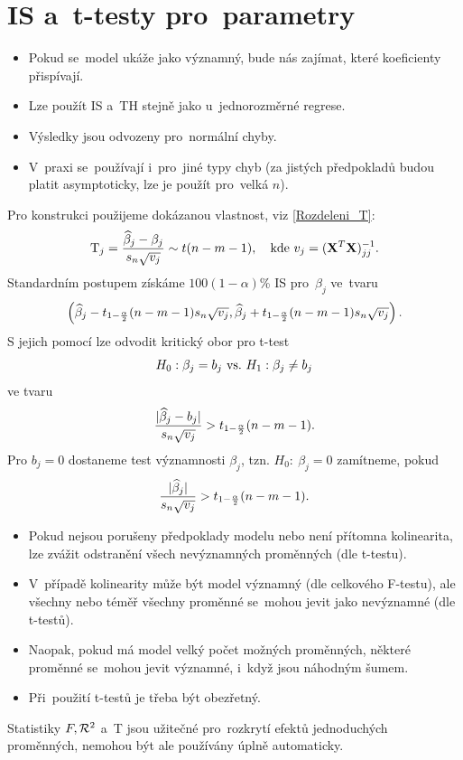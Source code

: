 \section{IS a~t-testy pro~parametry}
\begin{itemize}
	\item Pokud se~model ukáže jako významný, bude nás zajímat, které koeficienty přispívají.
	\item Lze použít IS a~TH stejně jako u~jednorozměrné regrese.
	\item Výsledky jsou odvozeny pro~normální chyby.
	\item V~praxi se~používají i~pro~jiné typy chyb (za jistých předpokladů budou platit asymptoticky, lze je použít pro~velká $n$).
\end{itemize}
Pro konstrukci použijeme dokázanou vlastnost, viz \eqref{Rozdeleni_T}:
 $$ \mathrm{T}_j = \frac{\widehat{\beta}_j-\beta_j}{s_n\sqrt{v_j}}\sim t(n-m-1),\quad\text{kde } v_j = (\mathbf{X}^T\mathbf{X})_{jj}^{-1}. $$
Standardním postupem získáme $100(1-\alpha)$\% IS pro~$\beta_j$ ve~tvaru
 $$ \left(\widehat{\beta}_j-t_{1-\frac{\alpha}{2}}(n-m-1)s_n\sqrt{v_j},\widehat{\beta}_j+t_{1-\frac{\alpha}{2}}(n-m-1)s_n\sqrt{v_j} \right).$$
S jejich pomocí lze odvodit kritický obor pro t-test
 $$ H_0: \beta_j = b_j ~\text{vs.}~ H_1: \beta_j\neq b_j $$
ve tvaru
 $$ \frac{|\widehat{\beta}_j-b_j|}{s_n\sqrt{v_j}}>t_{1-\frac{\alpha}{2}}(n-m-1).$$
Pro $b_j = 0$ dostaneme test významnosti $\beta_j$, tzn. $H_0:~\beta_j = 0$ zamítneme, pokud
 $$ \frac{|\widehat{\beta}_j|}{s_n\sqrt{v_j}}>t_{1-\frac{\alpha}{2}}(n-m-1). $$
\begin{remark}
	\begin{itemize}
		\item Pokud nejsou porušeny předpoklady modelu nebo není přítomna kolinearita, lze zvážit odstranění všech nevýznamných proměnných (dle t-testu).
		\item V~případě kolinearity může být model významný (dle celkového F-testu), ale všechny nebo téměř všechny proměnné se~mohou jevit jako nevýznamné (dle t-testů).
		\item Naopak, pokud má model velký počet možných proměnných, některé proměnné se~mohou jevit významné, i~když jsou náhodným šumem.
		\item Při~použití t-testů je třeba být obezřetný.
	\end{itemize}
\end{remark}
\begin{remark}
	Statistiky $F,\mathcal{R}^2$ a~T jsou užitečné pro~rozkrytí efektů jednoduchých proměnných, nemohou být ale používány úplně automaticky.
\end{remark}

